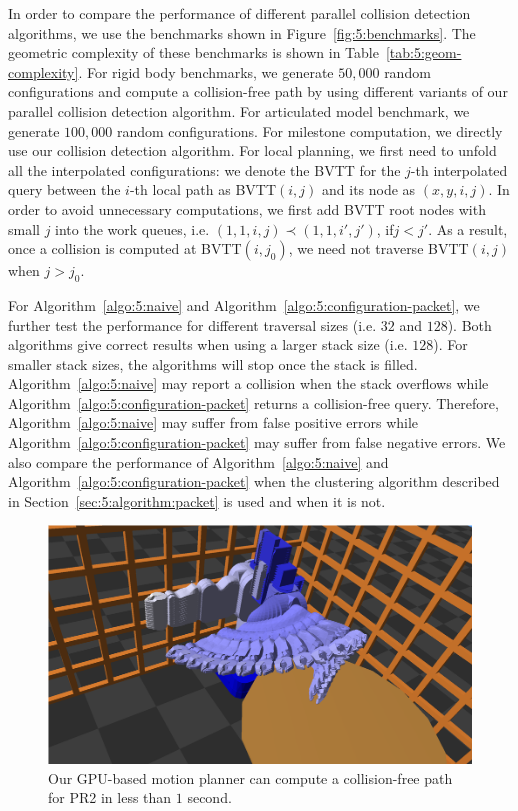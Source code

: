 In order to compare the performance of different parallel collision detection algorithms, we use the benchmarks shown
in Figure~\ref{fig:5:benchmarks}. The geometric complexity of these benchmarks is shown in  Table~\ref{tab:5:geom-complexity}.
For rigid body benchmarks, we generate $50,000$ random configurations and compute a collision-free path by using different
variants of our parallel collision detection algorithm. For articulated model benchmark, we generate $100,000$
random configurations. For milestone computation, we directly use our collision
detection algorithm. For local planning, we first need to unfold all the interpolated configurations: we denote the
BVTT for the $j$-th interpolated query between the $i$-th local path as BVTT$(i,j)$ and its node as $(x,y,i,j)$.
In order to avoid unnecessary computations, we first add BVTT root nodes with small $j$ into the work queues,
i.e. $(1,1,i,j) \prec (1,1,i',j')$, if$j < j'$. As a result, once a collision is computed at BVTT$(i, j_0)$,
we need not traverse BVTT$(i, j)$ when $j > j_0$.

For Algorithm~\ref{algo:5:naive} and Algorithm~\ref{algo:5:configuration-packet}, we further test the performance for
different traversal sizes (i.e. $32$ and $128$). Both algorithms give correct results when using a larger stack size (i.e.
$128$). For smaller stack sizes, the algorithms will stop once the stack is filled.
Algorithm~\ref{algo:5:naive} may report a collision when the stack overflows while Algorithm~\ref{algo:5:configuration-packet}
returns a collision-free query. Therefore, Algorithm~\ref{algo:5:naive} may suffer from false positive errors while Algorithm~\ref{algo:5:configuration-packet}
may suffer from false negative errors. We also
compare the performance of Algorithm~\ref{algo:5:naive} and Algorithm~\ref{algo:5:configuration-packet} when the clustering algorithm described in Section~\ref{sec:5:algorithm:packet} is used and when it is not.

\begin{figure}[htb]
  \centering
  \includegraphics[width=\linewidth]{figs/5/pr2_result.png}
  \caption[The GPU-based motion planner can compute a collision-free path for PR2 in less than $1$ second]{Our GPU-based motion planner can compute a collision-free path for PR2 in less than $1$ second. }
  \label{fig:5:PR2result}
\end{figure}


